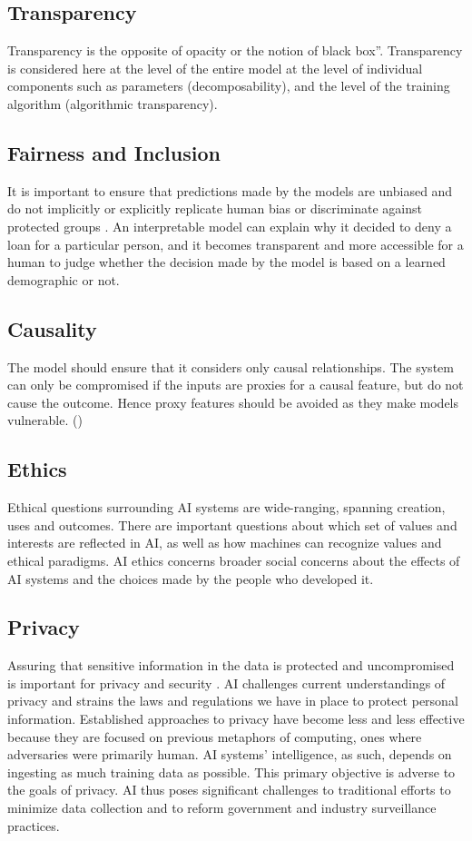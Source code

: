 \subsection{Transparency}

Transparency is the opposite of opacity or the notion of black box”. Transparency is considered here at the level of the entire model at the level of individual components such as parameters (decomposability), and the level of the training algorithm (algorithmic transparency). 

\subsection{Fairness and Inclusion}

It is important to ensure that predictions made by the models are unbiased and do not implicitly or explicitly replicate human bias or discriminate against protected groups \cite{ainow2016report}. An interpretable model can explain why it decided to deny a loan for a particular person, and it becomes transparent and more accessible for a human to judge whether the decision made by the model is based on a learned demographic or not.

\subsection{Causality}
The model should ensure that it considers only causal relationships.  The system can only be compromised if the inputs are proxies for a causal feature, but do not cause the outcome. Hence proxy features should be avoided as they make models vulnerable. (\cite{molnar})

\subsection{Ethics}

Ethical questions surrounding AI systems are wide-ranging, spanning creation, uses and outcomes. There are important questions about which set of values and interests are reflected in AI, as well as how machines can recognize values and ethical paradigms. AI ethics concerns broader social concerns about the effects of AI systems and the choices made by the people who developed it.

\subsection{Privacy}
Assuring that sensitive information in the data is protected and uncompromised is important for privacy and security \cite{molnar}. AI challenges current understandings of privacy and strains the laws and regulations we have in place to protect personal information. Established approaches to privacy have become less and less effective because they are focused on previous metaphors of computing, ones where adversaries were primarily human. AI systems’ intelligence, as such, depends on ingesting as much training data as possible. This primary objective is adverse to the goals of privacy. AI thus poses significant challenges to traditional efforts to minimize data collection and to reform government and industry surveillance practices. 

